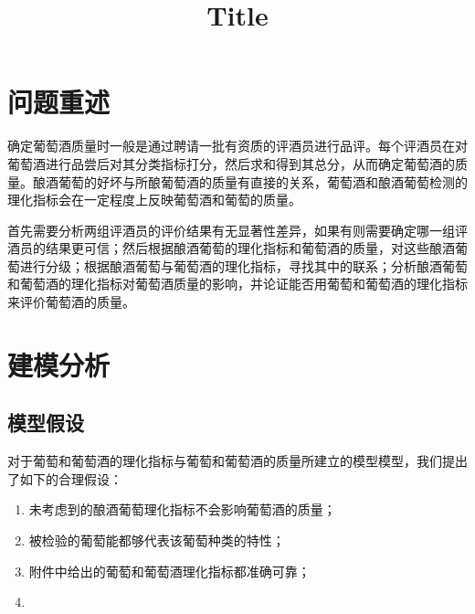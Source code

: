 \documentclass{cumcmart}
\begin{document}


\title{Title}

\maketitle

\begin{cnabstract}%


\end{cnabstract}

\newpage


\section{问题重述}
确定葡萄酒质量时一般是通过聘请一批有资质的评酒员进行品评。每个评酒员在对葡萄酒进行品尝后对其分类指标打分，然后求和得到其总分，从而确定葡萄酒的质量。酿酒葡萄的好坏与所酿葡萄酒的质量有直接的关系，葡萄酒和酿酒葡萄检测的理化指标会在一定程度上反映葡萄酒和葡萄的质量。

首先需要分析两组评酒员的评价结果有无显著性差异，如果有则需要确定哪一组评酒员的结果更可信；然后根据酿酒葡萄的理化指标和葡萄酒的质量，对这些酿酒葡萄进行分级；根据酿酒葡萄与葡萄酒的理化指标，寻找其中的联系；分析酿酒葡萄和葡萄酒的理化指标对葡萄酒质量的影响，并论证能否用葡萄和葡萄酒的理化指标来评价葡萄酒的质量。


\section{建模分析}

\subsection{模型假设}
对于葡萄和葡萄酒的理化指标与葡萄和葡萄酒的质量所建立的模型模型，我们提出了如下的合理假设：
\begin{enumerate}
\item 未考虑到的酿酒葡萄理化指标不会影响葡萄酒的质量；
\item 被检验的葡萄能都够代表该葡萄种类的特性；
\item 附件中给出的葡萄和葡萄酒理化指标都准确可靠；
\item 
\end{enumerate}
\end{document}
